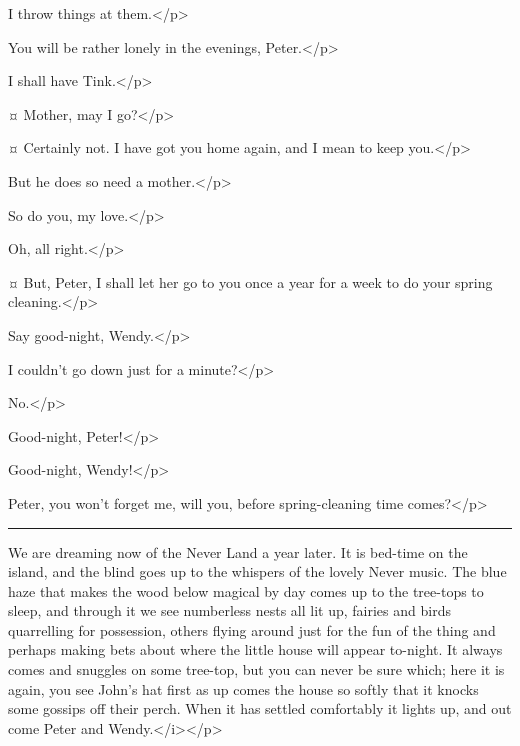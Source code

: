 \begin{drama}
\peterspeaks
I throw things at them.</p>

\wendyspeaks
You will be rather lonely in the evenings, Peter.</p>

\peterspeaks
I shall have Tink.</p>

\wendyspeaks {}¤
Mother, may I go?</p>

\mrsdarlingspeaks {}¤
Certainly not.
I have got you home again, and I mean to keep you.</p>

\wendyspeaks
But he does so need a mother.</p>

\mrsdarlingspeaks
So do you, my love.</p>

\peterspeaks
Oh, all right.</p>

\mrsdarlingspeaks {}¤
But, Peter, I shall let her go to you once a year for a week to do your spring cleaning.</p>


\mrsdarlingspeaks
Say good-night, Wendy.</p>

\wendyspeaks
I couldn't go down just for a minute?</p>

\mrsdarlingspeaks
No.</p>

\wendyspeaks
Good-night, Peter!</p>

\peterspeaks
Good-night, Wendy!</p>

\wendyspeaks
Peter, you won't forget me, will you, before spring-cleaning time comes?</p>


\plainbreak{1}

\begin{stagedir}
We are dreaming now of the Never Land a year later.
It is bed-time on the island, and the blind goes up to the whispers of the lovely Never music.
The blue haze that makes the wood below magical by day comes up to the tree-tops to sleep,
and through it we see numberless nests all lit up, fairies and birds quarrelling for possession,
others flying around just for the fun of the thing
and perhaps making bets about where the little house will appear to-night.
It always comes and snuggles on some tree-top, but you can never be sure which;
here it is again, you see John's hat first as up comes the house
so softly that it knocks some gossips off their perch.
When it has settled comfortably it lights up, and out come Peter and Wendy.</i></p>


\end{stagedir}
\end{drama}
